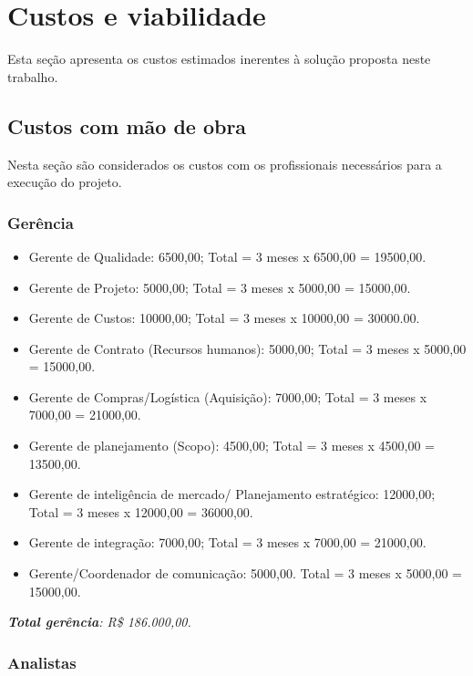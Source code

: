 \chapter{Custos e viabilidade}

  Esta seção apresenta os custos estimados inerentes à solução proposta neste trabalho.
  
   \section{Custos com mão de obra}
   
      Nesta seção são considerados os custos com os profissionais necessários para a execução do projeto.
      
      \subsection{Gerência}
		
	\begin{itemize}
	 
	  \item Gerente de Qualidade: 6500,00;
		  \subitem Total = 3 meses x 6500,00 = 19500,00.
	  \item Gerente de Projeto: 5000,00;
		  \subitem Total = 3 meses x 5000,00 = 15000,00.
	  \item Gerente de Custos: 10000,00;
		  \subitem Total = 3 meses x 10000,00 = 30000.00.
	  \item Gerente de Contrato (Recursos humanos): 5000,00;
		  \subitem Total = 3 meses x 5000,00 = 15000,00.
	  \item Gerente de Compras/Logística (Aquisição): 7000,00;
		  \subitem Total = 3 meses x 7000,00 = 21000,00.
	  \item Gerente de planejamento (Scopo): 4500,00;
		  \subitem Total = 3 meses x 4500,00 = 13500,00.
	  \item Gerente de inteligência de mercado/ Planejamento estratégico: 12000,00;
		  \subitem Total = 3 meses x 12000,00 = 36000,00.
	  \item Gerente de integração: 7000,00;
		  \subitem Total = 3 meses x 7000,00 = 21000,00.
	  \item Gerente/Coordenador de comunicação: 5000,00.
		  \subitem Total = 3 meses x 5000,00 = 15000,00.

	\end{itemize}

	\emph{\textbf{Total gerência}: R\$ 186.000,00.}
	
      \subsection{Analistas}
      
